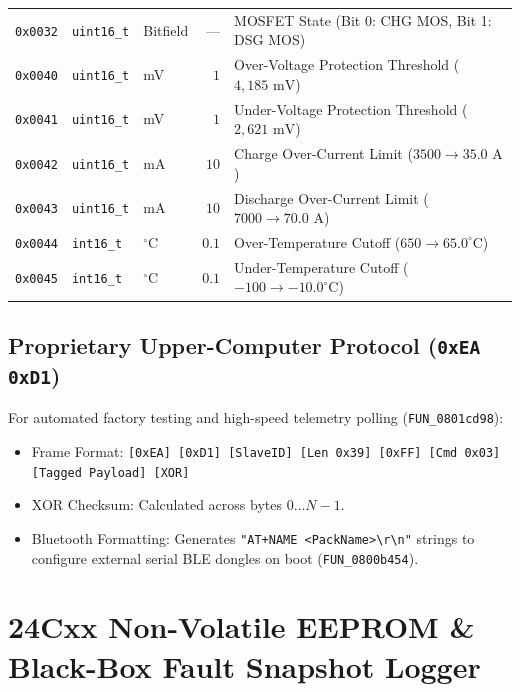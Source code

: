 \documentclass[10pt,a4paper]{article}
\begin{document}
\begin{table}[htbp]
\begin{tabularx}{\textwidth}{lllrX}
\texttt{0x0032} & \texttt{uint16\_t} & Bitfield & --- & MOSFET State (Bit 0: CHG MOS, Bit 1: DSG MOS) \\
\texttt{0x0040} & \texttt{uint16\_t} & mV & $1$ & Over-Voltage Protection Threshold ($4,185\text{ mV}$) \\
\texttt{0x0041} & \texttt{uint16\_t} & mV & $1$ & Under-Voltage Protection Threshold ($2,621\text{ mV}$) \\
\texttt{0x0042} & \texttt{uint16\_t} & mA & $10$ & Charge Over-Current Limit ($3500 \rightarrow 35.0\text{ A}$) \\
\texttt{0x0043} & \texttt{uint16\_t} & mA & $10$ & Discharge Over-Current Limit ($7000 \rightarrow 70.0\text{ A}$) \\
\texttt{0x0044} & \texttt{int16\_t} & $^\circ\text{C}$ & $0.1$ & Over-Temperature Cutoff ($650 \rightarrow 65.0^\circ\text{C}$) \\
\texttt{0x0045} & \texttt{int16\_t} & $^\circ\text{C}$ & $0.1$ & Under-Temperature Cutoff ($-100 \rightarrow -10.0^\circ\text{C}$) \\
\bottomrule
\end{tabularx}
\end{table}

\subsection{Proprietary Upper-Computer Protocol (\texttt{0xEA 0xD1})}
For automated factory testing and high-speed telemetry polling (\texttt{FUN\_0801cd98}):
\begin{itemize}
    \item Frame Format: \texttt{[0xEA] [0xD1] [SlaveID] [Len 0x39] [0xFF] [Cmd 0x03] [Tagged Payload] [XOR]}
    \item XOR Checksum: Calculated across bytes $0\dots N-1$.
    \item Bluetooth Formatting: Generates \texttt{"AT+NAME <PackName>\textbackslash r\textbackslash n"} strings to configure external serial BLE dongles on boot (\texttt{FUN\_0800b454}).
\end{itemize}

\section{24Cxx Non-Volatile EEPROM \& Black-Box Fault Snapshot Logger}
\end{document}
